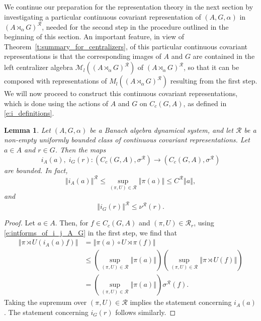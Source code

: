\documentclass{amsart}
\theoremstyle{plain}
\newtheorem{lemma}[theorem]{Lemma}
\theoremstyle{definition}
\numberwithin{equation}{section}
\begin{document}
We continue our preparation for the representation theory in the next section by investigating a particular continuous covariant representation of ${(A,G,\alpha)}$ in ${(A {\rtimes}_\alpha G)^\mathcal{R}}$, needed for the second step in the procedure outlined in the beginning of this section. An important feature, in view of Theorem~\ref{t:summary_for_centralizers}, of this particular continuous covariant representations is that the corresponding images of $A$ and $G$ are contained in the left centralizer algebra $\mathcal M_l({(A {\rtimes}_\alpha G)^\mathcal{R}})$ of ${(A {\rtimes}_\alpha G)^\mathcal{R}}$, so that it can be composed with representations of $M_l({(A {\rtimes}_\alpha G)^\mathcal{R}})$ resulting from the first step. We will now proceed to construct this continuous covariant representations, which is done using the actions of $A$ and $G$ on $C_c(G,A)$, as defined in \eqref{e:i_definitions}.

\begin{lemma}\label{l:i_action_sigma_bounded}
Let ${(A,G,\alpha)}$ be a Banach algebra dynamical system, and let ${\mathcal R}$ be a non-empty uniformly bounded class of continuous covariant representations. Let $a\in A$ and $r\in G$. Then the maps
\[ i_A(a), \; i_G(r): (C_c(G,A), {\sigma^{\mathcal R}}) \to (C_c(G,A), {\sigma^{\mathcal R}}) \]
are bounded. In fact,
\[ {\left\Vert {i_A(a)} \right\Vert^{\mathcal R}} \leq \sup_{{(\pi,U)}\in{\mathcal R}} {\left\Vert {\pi(a)} \right\Vert}\leq {{C^{\mathcal R}}}{\left\Vert {a} \right\Vert}, \]
and
\[ {\left\Vert {i_G(r)} \right\Vert^{\mathcal R}} \leq {\nu^{\mathcal R}}(r).\]
\end{lemma}

\begin{proof}
Let $a\in A$. Then, for $f\in C_c(G,A)$ and ${(\pi,U)} \in {\mathcal R}_r$, using \eqref{e:intforms_of_i_j_A_G} in the first step, we find that
\begin{align*}
  {\left\Vert {{\pi \rtimes U}(i_A(a)f)} \right\Vert} &= {\left\Vert {\pi(a) \circ {U \rtimes \pi}(f)} \right\Vert} \\
&\leq \left(\sup_{{(\pi,U)}\in{\mathcal R}} {\left\Vert {\pi(a)} \right\Vert}\right) \left(\sup_{{(\pi,U)}\in{\mathcal R}} {\left\Vert {{\pi \rtimes U}(f)} \right\Vert}\right)\\
&=\left(\sup_{{(\pi,U)}\in{\mathcal R}} {\left\Vert {\pi(a)} \right\Vert}\right) {\sigma^{\mathcal R}}(f).
\end{align*}
Taking the supremum over ${(\pi,U)} \in {\mathcal R}$ implies the statement concerning $i_A(a)$. The statement concerning $i_G(r)$ follows similarly.
\end{proof}
\end{document}
